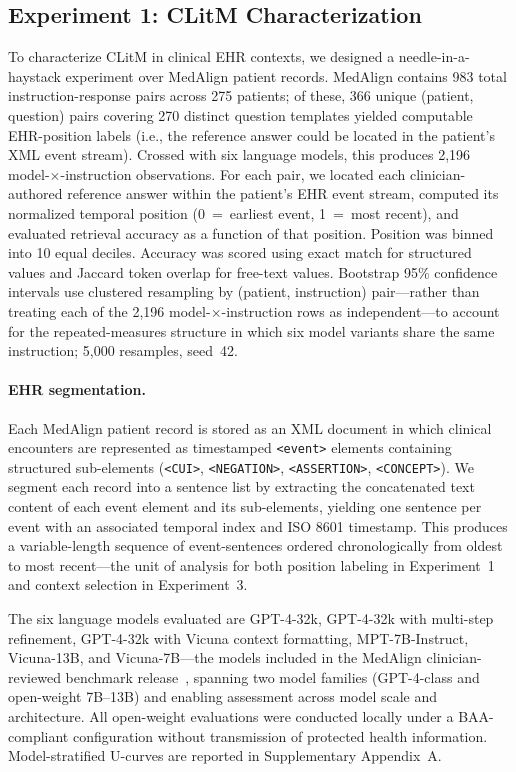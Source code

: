 \documentclass{article}
\begin{document}
\subsection{Experiment 1: CLitM Characterization}
\label{sec:exp1}

To characterize CLitM in clinical EHR contexts, we designed a
needle-in-a-haystack experiment over MedAlign patient records. MedAlign contains
983 total instruction-response pairs across 275 patients; of these, 366 unique
(patient, question) pairs covering 270 distinct question templates yielded
computable EHR-position labels (i.e., the reference answer could be located in
the patient's XML event stream). Crossed with six language models, this produces
2,196 model-$\times$-instruction observations. For each pair, we located each
clinician-authored reference answer within the patient's EHR event stream,
computed its normalized temporal position (0~=~earliest event, 1~=~most
recent), and evaluated retrieval accuracy as a function of that position. Position was binned into 10 equal deciles. Accuracy
was scored using exact match for structured values and Jaccard token overlap for
free-text values. Bootstrap 95\% confidence intervals use clustered resampling
by (patient, instruction) pair---rather than treating each of the 2,196
model-$\times$-instruction rows as independent---to account for the
repeated-measures structure in which six model variants share the same
instruction; 5,000 resamples, seed~42.

\paragraph{EHR segmentation.} Each MedAlign patient record is stored as an XML
document in which clinical encounters are represented as timestamped
\texttt{<event>} elements containing structured sub-elements
(\texttt{<CUI>}, \texttt{<NEGATION>}, \texttt{<ASSERTION>}, \texttt{<CONCEPT>}).
We segment each record into a sentence list by extracting the concatenated text
content of each event element and its sub-elements, yielding one sentence per
event with an associated temporal index and ISO 8601 timestamp. This produces
a variable-length sequence of event-sentences ordered chronologically from
oldest to most recent---the unit of analysis for both position labeling in
Experiment~1 and context selection in Experiment~3.

The six language models evaluated are GPT-4-32k, GPT-4-32k with multi-step
refinement, GPT-4-32k with Vicuna context formatting, MPT-7B-Instruct,
Vicuna-13B, and Vicuna-7B---the models included in the MedAlign clinician-reviewed
benchmark release~\cite{fleming2024medalign}, spanning two model families
(GPT-4-class and open-weight 7B--13B) and enabling assessment across model scale
and architecture. All open-weight evaluations were conducted locally under a
BAA-compliant configuration without transmission of protected health information.
Model-stratified U-curves are reported in Supplementary Appendix~A.
\end{document}
